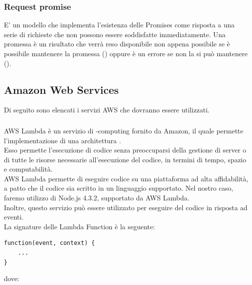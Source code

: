 \subsubsection{Request promise}
E' un modello che implementa l'esistenza delle Promises come risposta a una serie di richieste che non possono essere soddisfatte immediatamente. Una promessa è un risultato che verrà reso disponibile non appena possibile se è possibile mantenere la promessa () oppure è un errore se non la si può mantenere ().
\newpage
\subsection{Amazon Web Services}
Di seguito sono elencati i servizi AWS che dovranno essere utilizzati.

\subsubsection{}
AWS Lambda è un servizio di -computing fornito da Amazon, il quale permette l'implementazione di una architettura . \\
Esso permette l'esecuzione di codice senza preoccuparsi della gestione di server o di tutte le risorse necessarie all'esecuzione del codice, in termini di tempo, spazio e computabilità. \\
AWS Lambda permette di eseguire codice su una piattaforma ad alta affidabilità, a patto che il codice sia scritto in un linguaggio supportato. Nel nostro caso, faremo utilizzo di Node.js 4.3.2, supportato da AWS Lambda. \\
Inoltre, questo servizio può essere utilizzato per eseguire del codice in risposta ad eventi. \\
La signature delle Lambda Function è la seguente:
\begin{verbatim}
function(event, context) {
    ...
}
\end{verbatim}
dove:
